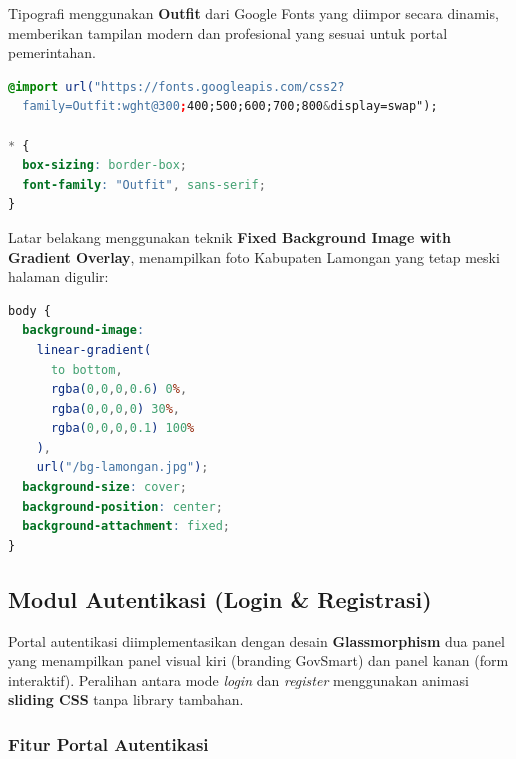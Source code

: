 \documentclass[12pt,a4paper]{article}
\begin{document}
Tipografi menggunakan \textbf{Outfit} dari Google Fonts yang diimpor secara dinamis,
memberikan tampilan modern dan profesional yang sesuai untuk portal pemerintahan.

\begin{lstlisting}[language=CSS, caption=Import Font Outfit]
@import url("https://fonts.googleapis.com/css2?
  family=Outfit:wght@300;400;500;600;700;800&display=swap");

* {
  box-sizing: border-box;
  font-family: "Outfit", sans-serif;
}
\end{lstlisting}

Latar belakang menggunakan teknik \textbf{Fixed Background Image with Gradient Overlay},
menampilkan foto Kabupaten Lamongan yang tetap meski halaman digulir:

\begin{lstlisting}[language=CSS, caption=Latar belakang halaman utama]
body {
  background-image:
    linear-gradient(
      to bottom,
      rgba(0,0,0,0.6) 0%,
      rgba(0,0,0,0) 30%,
      rgba(0,0,0,0.1) 100%
    ),
    url("/bg-lamongan.jpg");
  background-size: cover;
  background-position: center;
  background-attachment: fixed;
}
\end{lstlisting}

\subsection{Modul Autentikasi (Login \& Registrasi)}

Portal autentikasi diimplementasikan dengan desain \textbf{Glassmorphism} dua panel
yang menampilkan panel visual kiri (branding GovSmart) dan panel kanan (form interaktif).
Peralihan antara mode \textit{login} dan \textit{register} menggunakan animasi
\textbf{sliding CSS} tanpa library tambahan.

\subsubsection{Fitur Portal Autentikasi}
\end{document}
